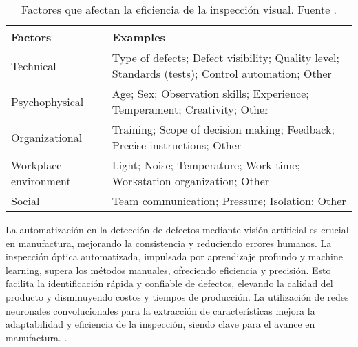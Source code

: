 \begin{table}[H]
	\centering
	\caption[Factores que afectan la eficiencia de la inspección visual.]{Factores que afectan la eficiencia de la inspección visual. Fuente \cite{KujawinskaVogt2015}.}
	\begin{tabular}{|p{10em}|p{20em}|}
		\hline
		\textbf{Factors} & \textbf{Examples}\\
		\hline
		Technical & {Type of defects; Defect visibility; Quality level; Standards (tests); Control automation;  Other}\\
		\hline
		Psychophysical & Age;  Sex;  Observation  skills;  Experience;  Temperament;  Creativity;  Other\\
		\hline
		Organizational & Training;  Scope  of  decision  making; Feedback;  Precise  instructions;  Other\\
		\hline
		Workplace environment & {Light; Noise; Temperature; Work time; Workstation organization; Other}\\
		\hline
		Social & {Team communication;  Pressure;  Isolation; Other}\\
		\hline
	\end{tabular}%
	\label{tab:eficiencia_inspección}%
\end{table}%

La automatización en la detección de defectos mediante visión artificial es crucial en manufactura, mejorando la consistencia y reduciendo errores humanos. La inspección óptica automatizada, impulsada por aprendizaje profundo y machine learning, supera los métodos manuales, ofreciendo eficiencia y precisión. Esto facilita la identificación rápida y confiable de defectos, elevando la calidad del producto y disminuyendo costos y tiempos de producción. La utilización de redes neuronales convolucionales para la extracción de características mejora la adaptabilidad y eficiencia de la inspección, siendo clave para el avance en manufactura. \cite{SanchezRomero2023}.

